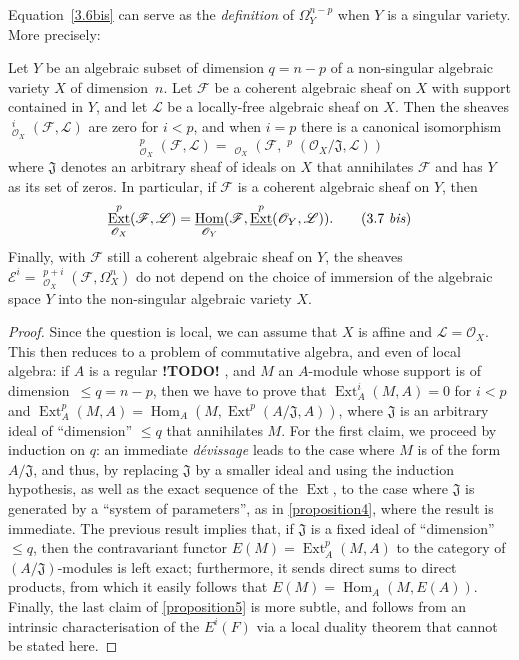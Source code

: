 \documentclass{article}
\theoremstyle{plain}
\newenvironment{proposition}[1]
    {\renewcommand\theinnercustomproposition{#1}\innercustomproposition}
    {\endinnercustomproposition}
\theoremstyle{definition}
\newcommand{\sh}{\mathscr}
\renewcommand{\leq}{\leqslant}
\DeclareMathOperator{\Ext}{Ext}
\DeclareMathOperator{\Hom}{Hom}
\DeclareMathOperator{\shExt}{\underline{Ext}}
\DeclareMathOperator{\shHom}{\underline{Hom}}
\newcommand{\todo}{\textbf{ !TODO! }}
\newcommand{\oldpage}[1]{\marginpar{\footnotesize$\Big\vert$ \textit{p.~#1}}}
\begin{document}
Equation~\cref{3.6bis} can serve as the \emph{definition} of $\Omega_Y^{n-p}$ when $Y$ is a singular variety.
More precisely:

\begin{proposition}{5}
\label{proposition5}
  Let $Y$ be an algebraic subset of dimension $q=n-p$ of a non-singular algebraic variety $X$ of dimension~$n$.
  Let $\sh{F}$ be a coherent algebraic sheaf on $X$ with support contained in $Y$, and let $\sh{L}$ be a locally-free algebraic sheaf on $X$.
  Then the sheaves $\shExt_{\sh{O}_X}^i(\sh{F},\sh{L})$ are zero for $i<p$, and when $i=p$ there is a canonical isomorphism
  \[
  \label{3.7}
    \shExt_{\sh{O}_X}^p(\sh{F},\sh{L}) = \shHom_{\sh{O}_X}(\sh{F},\shExt^p(\sh{O}_X/\mathfrak{J},\sh{L}))
  \tag{3.7}
  \]
  where $\mathfrak{J}$ denotes an arbitrary sheaf of ideals on $X$ that annihilates $\sh{F}$ and has $Y$ as its set of zeros.
  In particular, if $\sh{F}$ is a coherent algebraic sheaf on $Y$, then
  \[
  \label{3.7bis}
    \shExt_{\sh{O}_X}^p(\sh{F},\sh{L}) = \shHom_{\sh{O}_Y}(\sh{F},\shExt^p(\sh{O}_Y,\sh{L})).
  \tag{3.7 \emph{bis}}
  \]
  Finally, with $\sh{F}$ still a coherent algebraic sheaf on $Y$, the sheaves $\sh{E}^i=\shExt_{\sh{O}_X}^{p+i}(\sh{F},\Omega_X^n)$ do not depend on the choice of immersion of the algebraic space $Y$ into the non-singular algebraic variety $X$.
\end{proposition}

\begin{proof}
  Since the question is local, we can assume that $X$ is affine and $\sh{L}=\sh{O}_X$.
  This then reduces to a problem of commutative algebra, and even of local algebra:
  if $A$ is a regular \todo, and $M$ an $A$-module whose support is of dimension~$\leq q=n-p$, then we have to prove that $\Ext_A^i(M,A)=0$ for $i<p$ and $\Ext_A^p(M,A)=\Hom_A(M,\Ext^p(A/\mathfrak{J},A))$, where $\mathfrak{J}$ is an arbitrary ideal of ``dimension'' $\leq q$ that annihilates $M$.
  For the first claim, we proceed by induction on $q$:
  an immediate \emph{d\'{e}vissage} leads to the case where $M$ is of the form $A/\mathfrak{J}$, and thus, by replacing $\mathfrak{J}$ by a smaller ideal and using the induction hypothesis, as well as the exact sequence of the $\Ext$, to the case where $\mathfrak{J}$ is generated by a ``system of parameters'', as in \cref{proposition4}, where the result is immediate.
  The previous result implies that, if $\mathfrak{J}$ is a
\oldpage{149-09}
  fixed ideal of ``dimension'' $\leq q$, then the contravariant functor $E(M)=\Ext_A^p(M,A)$ to the category of $(A/\mathfrak{J})$-modules is left exact;
  furthermore, it sends direct sums to direct products, from which it easily follows that $E(M)=\Hom_A(M,E(A))$.
  Finally, the last claim of \cref{proposition5} is more subtle, and follows from an intrinsic characterisation of the $E^i(F)$ via a local duality theorem that cannot be stated here.
\end{proof}
\end{document}
